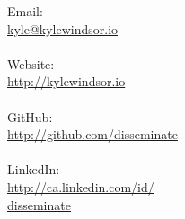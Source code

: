 
\begin{minipage}[t]{0.25\hsize}\color{contact} %
	Email:\\
	\href{mailto:kyle@kylewindsor.io}{kyle@kylewindsor.io}\\
	\\
	Website:\\
	\href{http://kylewindsor.io}{http://kylewindsor.io}\\
	\\
	GitHub:\\
	\href{http://github.com/disseminate/}{http://github.com/disseminate}\\
	\\
	LinkedIn:\\
	\href{http://ca.linkedin.com/in/disseminate}{http://ca.linkedin.com/id/\\disseminate}\\
\end{minipage}
